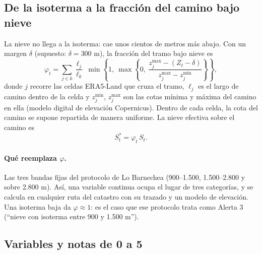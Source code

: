 \subsection{De la isoterma a la fracción del camino bajo nieve}


La nieve no llega a la isoterma: cae unos cientos de metros más abajo. Con un margen $\delta$ (supuesto: $\delta = 300$ m), la fracción del tramo bajo nieve es
\begin{equation}
\varphi_t = \sum_{j \in k} \frac{\ell_j}{\ell_k}\; \min\!\left\{1,\ \max\!\left\{0,\ \frac{z^{\max}_j - (Z_t - \delta)}{z^{\max}_j - z^{\min}_j}\right\}\right\},
\label{eq:phi}
\end{equation}
donde $j$ recorre las celdas ERA5-Land que cruza el tramo, $\ell_j$ es el largo de camino dentro de la celda y $z^{\min}_j$, $z^{\max}_j$ son las cotas mínima y máxima del camino en ella (modelo digital de elevación Copernicus). Dentro de cada celda, la cota del camino se supone repartida de manera uniforme. La nieve efectiva sobre el camino es
\begin{equation}
S^*_t = \varphi_t\, S_t .
\end{equation}

\paragraph{Qué reemplaza $\varphi$.} Las tres bandas fijas del protocolo de Lo Barnechea (900--1.500, 1.500--2.800 y sobre 2.800 m). Así, una variable continua ocupa el lugar de tres categorías, y se calcula en cualquier ruta del catastro con su trazado y un modelo de elevación. Una isoterma baja da $\varphi \approx 1$: es el caso que ese protocolo trata como Alerta 3 (``nieve con isoterma entre 900 y 1.500 m'').

\subsection{Variables y notas de 0 a 5}

